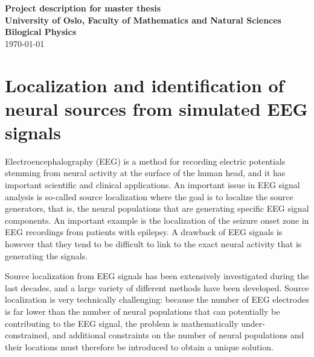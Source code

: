 \documentclass[a4paper,onecolumn,11pt]{revtex4-1}
\begin{document}
\begin{center}
{\bf \Large Project description for master thesis\\}
{\bf University of Oslo, Faculty of Mathematics and Natural Sciences\\
Bilogical Physics\\}
\today
\end{center}
\noindent

\section*{Localization and identification of neural sources from simulated EEG signals}

Electroencephalography (EEG) is a method for recording electric potentials stemming from neural activity at the surface of the human head, and it has important scientific and clinical applications. An important issue in EEG signal analysis is so-called source localization where the goal is to localize the source generators, that is, the neural populations that are generating specific EEG signal components. An important example is the localization of the seizure onset zone in EEG recordings from patients with epilepsy. A drawback of EEG signals is however that they tend to be difficult to link to the exact neural activity that is generating the signals.

Source localization from EEG signals has been extensively investigated during the last decades, and a large variety of different methods have been developed. Source localization is very technically challenging: because the number of EEG electrodes is far lower than the number of neural populations that can potentially be contributing to the EEG signal, the problem is mathematically under-constrained, and additional constraints on the number of neural populations and their locations must therefore be introduced to obtain a unique solution. 
\end{document}
